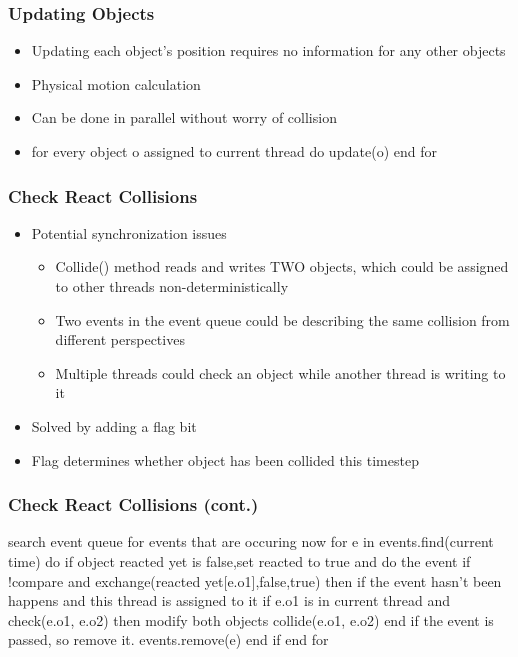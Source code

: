\documentclass{beamer}
\begin{document}
\begin{frame}
	\frametitle{Updating Objects}
	\begin{itemize}
		\item Updating each object's position requires no information for any other objects
		\item Physical motion calculation
		\item Can be done in parallel without worry of collision
		\item
for every object o assigned to current thread do
  update(o)
end for
	\end{itemize}
\end{frame}

\begin{frame}
	\frametitle{Check React Collisions}
	\begin{itemize}
		\item Potential synchronization issues
		\begin{itemize}
			\item Collide() method reads and writes TWO objects, which could be assigned to other threads non-deterministically
			\item Two events in the event queue could be describing the same collision from different perspectives
			\item Multiple threads could check an object while another thread is writing to it
		\end{itemize}
		\item Solved by adding a flag bit
		\item Flag determines whether object has been collided this timestep
	\end{itemize}
\end{frame}

\begin{frame}
	\frametitle{Check React Collisions (cont.)}
{search event queue for events that are occuring now}
for e in events.find(current time) do
  {if object reacted yet is false,set reacted to true and do the event}
  if !compare and exchange(reacted yet[e.o1],false,true)
  then
    {if the event hasn’t been happens and this thread is assigned to it}
    if e.o1 is in current thread and check(e.o1, e.o2) then
      {modify both objects}
      collide(e.o1, e.o2)
    end if
    {the event is passed, so remove it.}
    events.remove(e)
  end if
end for
\end{frame}
\end{document}
